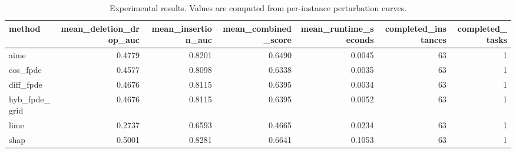 \begin{table}[t]
\caption{Experimental results. Values are computed from per-instance perturbation curves.}
\label{tab:main_results_computed}
\centering
\begin{tabular}{lrrrrrr}
\toprule
method & mean\_deletion\_drop\_auc & mean\_insertion\_auc & mean\_combined\_score & mean\_runtime\_seconds & completed\_instances & completed\_tasks \\
\midrule
aime & 0.4779 & 0.8201 & 0.6490 & 0.0045 & 63 & 1 \\
cos\_fpde & 0.4577 & 0.8098 & 0.6338 & 0.0035 & 63 & 1 \\
diff\_fpde & 0.4676 & 0.8115 & 0.6395 & 0.0034 & 63 & 1 \\
hyb\_fpde\_grid & 0.4676 & 0.8115 & 0.6395 & 0.0052 & 63 & 1 \\
lime & 0.2737 & 0.6593 & 0.4665 & 0.0234 & 63 & 1 \\
shap & 0.5001 & 0.8281 & 0.6641 & 0.1053 & 63 & 1 \\
\bottomrule
\end{tabular}

\end{table}
